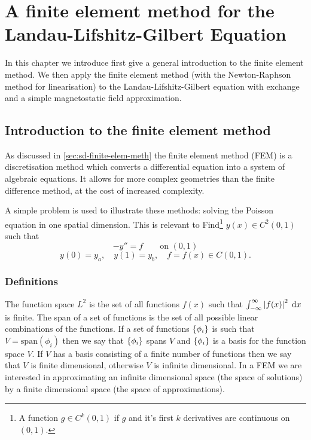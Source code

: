 \chapter{A finite element method for the Landau-Lifshitz-Gilbert Equation}
\label{sec:galerk-meth-llg}

In this chapter we introduce first give a general introduction to the finite element method.
We then apply the finite element method (with the Newton-Raphson method for linearisation) to the Landau-Lifshitz-Gilbert equation with exchange and a simple magnetostatic field approximation.

\section{Introduction to the finite element method}
\label{sec:intr-finite-ele-diff}

As discussed in \autoref{sec:sd-finite-elem-meth} the finite element method (FEM) is a discretisation method which converts a differential equation into a system of algebraic equations.
It allows for more complex geometries than the finite difference method, at the cost of increased complexity.

A simple problem is used to illustrate these methods: solving the Poisson
equation in one spatial dimension.
This is relevant to 
Find\footnote{A function $g\in C^{k}(0,1)$ if $g$ and it's first $k$ derivatives are continuous on $(0,1)$.} $y(x)\in C^{2}(0,1)$ such that
\begin{equation}
  -y''=f\qquad\text{on }(0,1)
  \label{eq:poisson1}
\end{equation}
\begin{equation*}
  y(0)=y_{a},\quad y(1)=y_{b},\quad f=f(x)\in C(0,1).
\end{equation*}


\subsection{Definitions}
\label{sec:fem-definitions}

The function space $L^{2}$ is the set of all functions $f(x)$ such that $\int_{-\infty}^{\infty}\left|{f(x)} \right|^{2} {\; \text{d}} x$ is finite.
The span of a set of functions is the set of all possible linear combinations of the functions. 
If a set of functions $\left\{ {\phi_i} \right\}$ is such that $V=\text{span}(\phi_i)$ then we say that $\left\{ {\phi_i} \right\}$ spans $V$ and $\left\{ {\phi_i} \right\}$ is a basis for the function space $V$.
If $V$ has a basis consisting of a finite number of functions then we say that $V$ is finite dimensional, otherwise $V$ is infinite dimensional.
In a FEM we are interested in approximating an infinite dimensional space (the space of solutions) by a finite dimensional space (the space of approximations).

